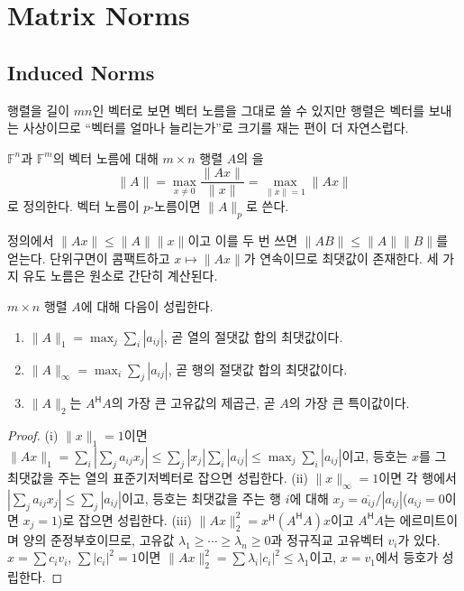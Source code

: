 \section{Matrix Norms}
\label{sec:matrix-norms}

\subsection{Induced Norms}

행렬을 길이 $mn$인 벡터로 보면 벡터 노름을 그대로 쓸 수 있지만 행렬은 벡터를 보내는 사상이므로 ``벡터를 얼마나 늘리는가''로 크기를 재는 편이 더 자연스럽다.

\begin{definition}[유도 노름]
\label{def:induced}
$\mathbb{F}^n$과 $\mathbb{F}^m$의 벡터 노름에 대해 $m\times n$ 행렬 $A$의 을
\[
\|A\|=\max_{x\ne0}\frac{\|Ax\|}{\|x\|}=\max_{\|x\|=1}\|Ax\|
\]
로 정의한다. 벡터 노름이 $p$-노름이면 $\|A\|_p$로 쓴다.
\end{definition}

정의에서 $\|Ax\|\le\|A\|\|x\|$이고 이를 두 번 쓰면  $\|AB\|\le\|A\|\|B\|$를 얻는다. 단위구면이 콤팩트하고 $x\mapsto\|Ax\|$가 연속이므로 최댓값이 존재한다. 세 가지 유도 노름은 원소로 간단히 계산된다.

\begin{theorem}
\label{thm:induced-formulas}
$m\times n$ 행렬 $A$에 대해 다음이 성립한다.
\begin{enumerate}
\item $\|A\|_1=\max_j\sum_i|a_{ij}|$, 곧 열의 절댓값 합의 최댓값이다.
\item $\|A\|_\infty=\max_i\sum_j|a_{ij}|$, 곧 행의 절댓값 합의 최댓값이다.
\item $\|A\|_2$는 $A^{\mathsf H}A$의 가장 큰 고유값의 제곱근, 곧 $A$의 가장 큰 특이값이다.
\end{enumerate}
\end{theorem}

\begin{proof}
(i) $\|x\|_1=1$이면 $\|Ax\|_1=\sum_i|\sum_ja_{ij}x_j|\le\sum_j|x_j|\sum_i|a_{ij}|\le\max_j\sum_i|a_{ij}|$이고, 등호는 $x$를 그 최댓값을 주는 열의 표준기저벡터로 잡으면 성립한다. (ii) $\|x\|_\infty=1$이면 각 행에서 $|\sum_ja_{ij}x_j|\le\sum_j|a_{ij}|$이고, 등호는 최댓값을 주는 행 $i$에 대해 $x_j=\overline{a_{ij}}/|a_{ij}|$($a_{ij}=0$이면 $x_j=1$)로 잡으면 성립한다. (iii) $\|Ax\|_2^2=x^{\mathsf H}(A^{\mathsf H}A)x$이고 $A^{\mathsf H}A$는 에르미트이며 양의 준정부호이므로, 고유값 $\lambda_1\ge\cdots\ge\lambda_n\ge0$과 정규직교 고유벡터 $v_i$가 있다. $x=\sum c_iv_i$, $\sum|c_i|^2=1$이면 $\|Ax\|_2^2=\sum\lambda_i|c_i|^2\le\lambda_1$이고, $x=v_1$에서 등호가 성립한다.
\end{proof}

